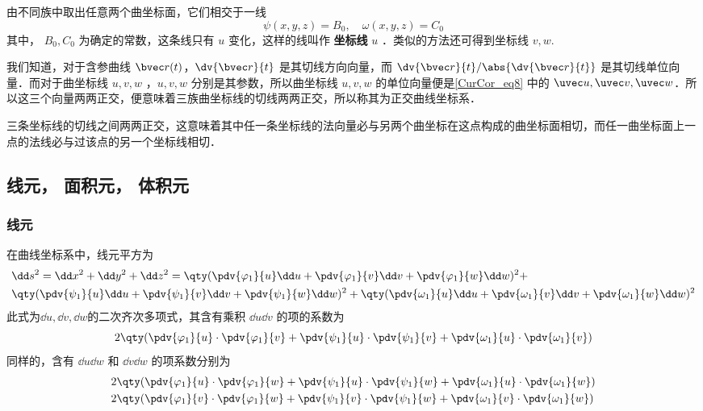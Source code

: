 由不同族中取出任意两个曲坐标面，它们相交于一线
\begin{equation}
\psi(x,y,z)=B_0,\quad \omega(x,y,z)=C_0
\end{equation}
其中， $B_0,C_0$ 为确定的常数，这条线只有 $u$ 变化，这样的线叫作 \textbf{坐标线} $u$ ．类似的方法还可得到坐标线 $v,w$.

我们知道，对于含参曲线 $\bvec r(t)$，$\dv{\bvec r}{t}$ 是其切线方向向量，而 $\dv{\bvec r}{t}/\abs{\dv{\bvec r}{t}}$ 是其切线单位向量．而对于曲坐标线 $u,v,w$ ，$u,v,w$ 分别是其参数，所以曲坐标线 $u,v,w$ 的单位向量便是\autoref{CurCor_eq8} 中的 $\uvec u,\uvec v,\uvec w$．所以这三个向量两两正交，便意味着三族曲坐标线的切线两两正交，所以称其为正交曲线坐标系．

三条坐标线的切线之间两两正交，这意味着其中任一条坐标线的法向量必与另两个曲坐标在这点构成的曲坐标面相切，而任一曲坐标面上一点的法线必与过该点的另一个坐标线相切．

\subsection{线元， 面积元， 体积元}
\subsubsection{线元}
在曲线坐标系中，线元平方为
\begin{equation}\label{CurCor_eq1}
\begin{aligned}
&\dd s^2=\dd x^2+\dd y^2+\dd z^2=\qty(\pdv{\varphi_1}{u}\dd u+\pdv{\varphi_1}{v}\dd v+\pdv{\varphi_1}{w}\dd w)^2+\\ 
&\qty(\pdv{\psi_1}{u}\dd u+\pdv{\psi_1}{v}\dd v+\pdv{\psi_1}{w}\dd w)^2+\qty(\pdv{\omega_1}{u}\dd u+\pdv{\omega_1}{v}\dd v+\pdv{\omega_1}{w}\dd w)^2
\end{aligned}
\end{equation}
此式为$\dd u,\dd v,\dd w$的二次齐次多项式，其含有乘积 $\dd u \dd v$ 的项的系数为
\begin{equation}
2\qty(\pdv{\varphi_1}{u}\cdot\pdv{\varphi_1}{v}+\pdv{\psi_1}{u}\cdot\pdv{\psi_1}{v}+\pdv{\omega_1}{u}\cdot\pdv{\omega_1}{v})
\end{equation}
同样的，含有 $\dd u\dd w$ 和 $\dd v\dd w$ 的项系数分别为
\begin{equation}
\begin{aligned}
& 2\qty(\pdv{\varphi_1}{u}\cdot\pdv{\varphi_1}{w}+\pdv{\psi_1}{u}\cdot\pdv{\psi_1}{w}+\pdv{\omega_1}{u}\cdot\pdv{\omega_1}{w})\\
&2\qty(\pdv{\varphi_1}{v}\cdot\pdv{\varphi_1}{w}+\pdv{\psi_1}{v}\cdot\pdv{\psi_1}{w}+\pdv{\omega_1}{v}\cdot\pdv{\omega_1}{w})
\end{aligned}
\end{equation}

